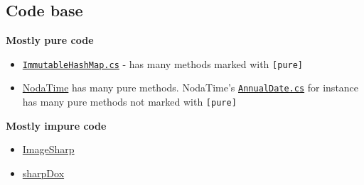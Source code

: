 \documentclass[a4paper,12pt]{article}
\begin{document}





\subsection{Code base} \label{sub:Code base}
\textbf{Mostly pure code}
\begin{itemize}
  \item \href{https://github.com/dotnet/roslyn/blob/master/src/Workspaces/SharedUtilitiesAndExtensions/Compiler/Core/Utilities/CompilerUtilities/ImmutableHashMap.cs}{\texttt{ImmutableHashMap.cs}} - has many methods marked with \texttt{[pure]}
  \item \href{https://github.com/nodatime/nodatime/blob/master/src/NodaTime}{NodaTime} has many pure methods. NodaTime's \href{https://github.com/nodatime/nodatime/blob/master/src/NodaTime/AnnualDate.cs}{\texttt{AnnualDate.cs}} for instance has many pure methods not marked with \texttt{[pure]}
\end{itemize}

\textbf{Mostly impure code}
\begin{itemize}
  \item \href{https://github.com/SixLabors/ImageSharp/blob/master/src/ImageSharp}{ImageSharp}
  \item \href{https://github.com/geaz/sharpDox}{sharpDox}
\end{itemize}
\end{document}
